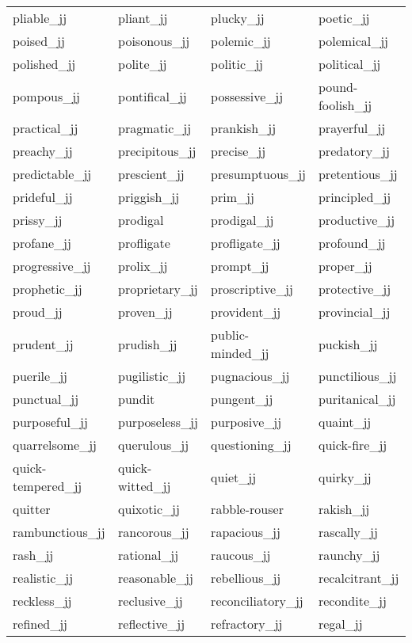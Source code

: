 \begin{longtable}[tbp]{| llll |}
   pliable\_jj & pliant\_jj & plucky\_jj & poetic\_jj \\
   poised\_jj & poisonous\_jj & polemic\_jj & polemical\_jj \\
   polished\_jj & polite\_jj & politic\_jj & political\_jj \\
   pompous\_jj & pontifical\_jj & possessive\_jj & pound-foolish\_jj \\
   practical\_jj & pragmatic\_jj & prankish\_jj & prayerful\_jj \\
   preachy\_jj & precipitous\_jj & precise\_jj & predatory\_jj \\
   predictable\_jj & prescient\_jj & presumptuous\_jj & pretentious\_jj \\
   prideful\_jj & priggish\_jj & prim\_jj & principled\_jj \\
   prissy\_jj & prodigal & prodigal\_jj & productive\_jj \\
   profane\_jj & profligate & profligate\_jj & profound\_jj \\
   progressive\_jj & prolix\_jj & prompt\_jj & proper\_jj \\
   prophetic\_jj & proprietary\_jj & proscriptive\_jj & protective\_jj \\
   proud\_jj & proven\_jj & provident\_jj & provincial\_jj \\
   prudent\_jj & prudish\_jj & public-minded\_jj & puckish\_jj \\
   puerile\_jj & pugilistic\_jj & pugnacious\_jj & punctilious\_jj \\
   punctual\_jj & pundit & pungent\_jj & puritanical\_jj \\
   purposeful\_jj & purposeless\_jj & purposive\_jj & quaint\_jj \\
   quarrelsome\_jj & querulous\_jj & questioning\_jj & quick-fire\_jj \\
   quick-tempered\_jj & quick-witted\_jj & quiet\_jj & quirky\_jj \\
   quitter & quixotic\_jj & rabble-rouser & rakish\_jj \\
   rambunctious\_jj & rancorous\_jj & rapacious\_jj & rascally\_jj \\
   rash\_jj & rational\_jj & raucous\_jj & raunchy\_jj \\
   realistic\_jj & reasonable\_jj & rebellious\_jj & recalcitrant\_jj \\
   reckless\_jj & reclusive\_jj & reconciliatory\_jj & recondite\_jj \\
   refined\_jj & reflective\_jj & refractory\_jj & regal\_jj \\

\end{longtable}
